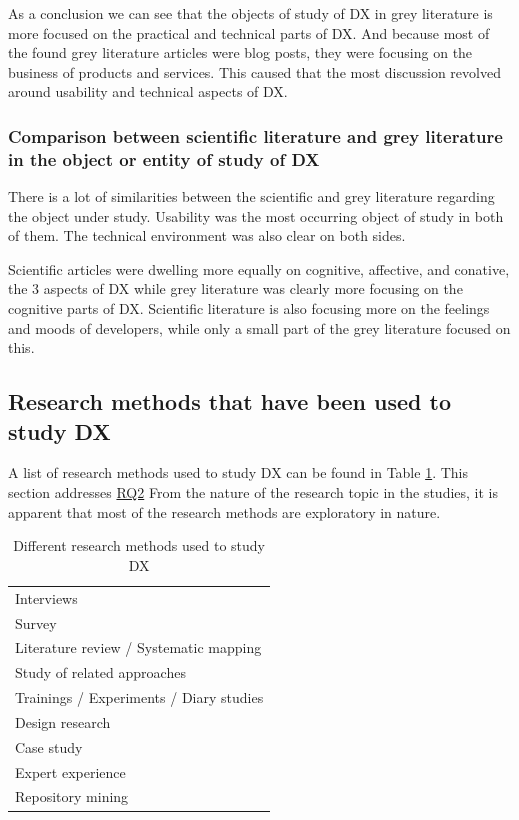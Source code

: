 \documentclass[english, 12pt, a4paper, sci, utf8, a-1b, online]{aaltothesis}
\begin{document}
As a conclusion we can see that the objects of study of DX in grey literature is more focused on the practical and technical parts of DX. And because most of the found grey literature articles were blog posts, they were focusing on the business of products and services. This caused that the most discussion revolved around usability and technical aspects of DX.

\subsubsection{Comparison between scientific literature and grey literature in the object or entity of study of DX}

There is a lot of similarities between the scientific and grey literature regarding the object under study. Usability was the most occurring object of study in both of them. The technical environment was also clear on both sides.

Scientific articles were dwelling more equally on cognitive, affective, and conative, the 3 aspects of DX while grey literature was clearly more focusing on the cognitive parts of DX. Scientific literature is also focusing more on the feelings and moods of developers, while only a small part of the grey literature focused on this.

\subsection{Research methods that have been used to study DX}

A list of research methods used to study DX can be found in Table \ref{table:research-methods}. This section addresses \hyperref[RQ2]{RQ2} From the nature of the research topic in the studies, it is apparent that most of the research methods are exploratory in nature.

\begin{table}[ht]
  \begin{center}
    \begin{tabular}{l}
      \hline
      Interviews                              \\
      Survey                                  \\
      Literature review / Systematic mapping  \\
      Study of related approaches             \\
      Trainings / Experiments / Diary studies \\
      Design research                         \\
      Case study                              \\
      Expert experience                       \\
      Repository mining                       \\
      \hline
    \end{tabular}
    \captionsetup{width=0.6\textwidth}
    \caption{Different research methods used to study DX}
    \label{table:research-methods}
  \end{center}
\end{table}
\end{document}

